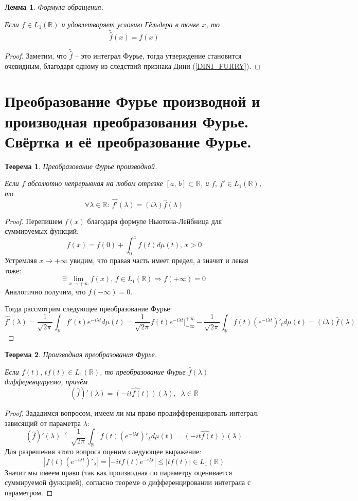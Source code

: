 \documentclass[a4paper,12pt]{article}
\renewcommand{\leq}{\ensuremath{\leqslant}}
\theoremstyle{plain}
\newtheorem{theorem}{Теорема}[section]
\newtheorem{lemma}{Лемма}[section]
\theoremstyle{definition}
\theoremstyle{remark}
\begin{document}
\begin{lemma}
	Формула обращения.

	Если $f \in L_1(\mathbb{R})$ и удовлетворяет условию Гёльдера в точке $x$, то
	\[\tilde{\hat{f}}(x) = f(x)\]
\end{lemma}

\begin{proof}
	Заметим, что $\tilde{\hat{f}}$ -- это интеграл Фурье, тогда утверждение становится очевидным, благодаря одному из следствий признака Дини (\ref{DINI_FURRY}).
\end{proof}

\section{Преобразование Фурье производной и производная преобразования Фурье. Свёртка и её преобразование Фурье.}
\begin{theorem}
	Преобразование Фурье производной.

	Если $f$ абсолютно непрерывная на любом отрезке $[a,\,b] \subset \mathbb{R}$, и $f,\, f' \in L_1(\mathbb{R})$, то
	\[\forall \lambda \in \mathbb{R}:\: \hat{f'}(\lambda) = (i\lambda)\hat{f}(\lambda)\]
\end{theorem}
\begin{proof}
	Перепишем $f(x)$ благодаря формуле Ньютона-Лейбница для суммируемых функций:
	\[f(x) = f(0) + \int_0^x f(t)d\mu(t),\, x > 0\]
	Устремляя $x \to +\infty$ увидим, что правая часть имеет предел, а значит и левая тоже:
	\[\exists \lim_{x \to +\infty}f(x),\, f \in L_1(\mathbb{R}) \Rightarrow f
		(+\infty) = 0\]
	Аналогично получим, что $f(-\infty) = 0$.

	Тогда рассмотрим следующее преобразование Фурье:
	\[\hat{f'}(\lambda) = \frac{1}{\sqrt{2\pi}}\int_\mathbb{R}f'(t)e^{-i\lambda t}d\mu(t) = \frac{1}{\sqrt{2\pi}}f(t)e^{-i\lambda t}|_{-\infty}^{+\infty} - \frac{1}{\sqrt{2\pi}}\int_\mathbb{R}f(t)(e^{-i\lambda t})'_td\mu(t) = (i\lambda)\hat{f}(\lambda)\]
\end{proof}

\begin{theorem}
	Производная преобразования Фурье.

	Если $f(t),\, tf(t) \in L_1(\mathbb{R})$, то преобразование Фурье $\hat{f}(\lambda)$ дифференцируемо, причём
	\[(\hat{f})'(\lambda) = \widehat{(-itf(t))}(\lambda),\;\; \lambda \in \mathbb{R}\]
\end{theorem}
\begin{proof}
	Зададимся вопросом, имеем ли мы право продифференцировать интеграл, зависящий от параметра $\lambda$:
	\[(\hat{f})'(\lambda) \stackrel{?}{=} \frac{1}{\sqrt{2\pi}}\int_\mathbb{R}f(t)(e^{-i\lambda t})'_\lambda d\mu(t) = \widehat{(-itf(t))}(\lambda)\]
	Для разрешения этого вопроса оценим следующее выражение:
	\[\left|f(t)(e^{-i\lambda t})'_\lambda\right| = \left|-itf(t)e^{-i\lambda t}\right| \leq |tf(t)| \in L_1(\mathbb{R})\]
	Значит мы имеем право (так как производная по параметру оценивается суммируемой функцией), согласно теореме о дифференцировании интеграла с параметром.
\end{proof}
\end{document}

